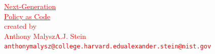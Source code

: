 \documentclass[11pt]{article}
\begin{document}
\begin{center}
    \textcolor{red}{
    \HUGE \underline{Next-Generation} \\
    \HUGE \underline{Policy as Code} \\
    \bigskip
    \normalsize created by \\
    \medskip
    \hspace{-2cm}\large Anthony Malysz\phantom{~~~~~~~~~~~~~~~~~~~~~~~~~~~~~~~~~~~~~~~~~~~~~~~~~~~~~~~~~~~~}A.J. Stein \\
    \hspace{-1.7cm}\normalsize\texttt{anthonymalysz@college.harvard.edu}\phantom{~~~~~~~~~~~~~~~~~~~~~~~~~~~~~~~~}\texttt{alexander.stein@nist.gov} \\
    }
\end{center}

\newpage
\end{document}
